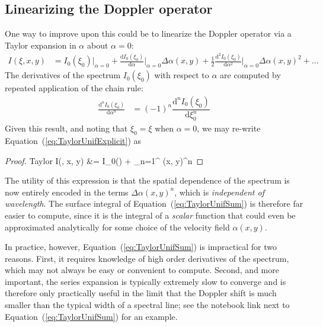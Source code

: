 \documentclass[modern]{aastex62}
\begin{document}
\subsection{Linearizing the Doppler operator}
\label{sec:taylor}

One way to improve upon this could be to linearize the Doppler operator via
a Taylor expansion in $\alpha$ about $\alpha=0$:
%
\begin{align}
    \label{eq:TaylorUnifExplicit}
    I(\xi, x, y) 
        &=
        I_0(\xi_0) \Bigg|_{\alpha=0}
        + 
        \frac{\mathrm{d}I_0(\xi_0)}{\mathrm{d}\alpha} \Bigg|_{\alpha=0} 
            \Delta\alpha(x, y)
        + 
        \frac{1}{2}\frac{\mathrm{d}^2I_0(\xi_0)}{\mathrm{d}\alpha^2} 
            \Bigg|_{\alpha=0} \Delta\alpha(x, y)^2
        +
        ... 
\end{align}
%
The derivatives of the spectrum $I_0(\xi_0)$ with respect to
$\alpha$ are computed by repeated application of the chain rule:
%
\begin{align}
    \frac{\mathrm{d}^nI_0(\xi_0)}{\mathrm{d}\alpha^n} &=
    (-1)^n\dfrac{\mathrm{d}^nI_0(\xi_0)}{\mathrm{d}\xi_0^n}
\end{align}
%
Given this result, and noting that $\xi_0 = \xi$ when $\alpha = 0$,
we may re-write Equation~(\ref{eq:TaylorUnifExplicit}) as
%
\begin{proof}{Taylor}
    \label{eq:TaylorUnifSum}
    I(\xi, x, y) 
        &=
        I_0(\xi)
        +
        \sum_{n=1}^\infty
            \Delta\alpha(x, y)^n
\end{proof}
%
The utility of this expression is that the spatial dependence of the spectrum
is now entirely encoded in the terms $\Delta\alpha(x, y)^n$, which is
\emph{independent of wavelength}. The surface integral of 
Equation~(\ref{eq:TaylorUnifSum}) is therefore far easier to compute, since
it is the integral of a \emph{scalar} function that could even be approximated
analytically for some choice of the velocity field $\alpha(x, y)$.

In practice, however, Equation~(\ref{eq:TaylorUnifSum}) is impractical for
two reasons. First, it requires knowledge of high order derivatives of the 
spectrum, which may not always be easy or convenient to compute. Second, and
more important, the series expansion is typically extremely slow to converge
and is therefore only practically useful in the limit that the Doppler shift
is much smaller than the typical width of a spectral line; see the notebook
link next to Equation~(\ref{eq:TaylorUnifSum}) for an example.
\end{document}
